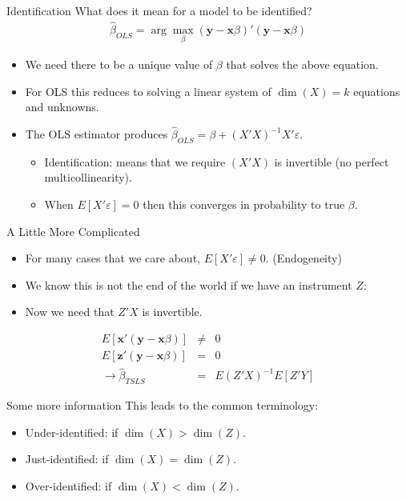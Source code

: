 \begin{frame}{Identification}
What does it mean for a model to be identified?
\begin{eqnarray*}
\hat{\beta}_{OLS} = \arg \max_{\beta} (\mathbf{y} - \mathbf{x} \beta)' (\mathbf{y} - \mathbf{x} \beta)
\end{eqnarray*}
\begin{itemize}
\item We need there to be a unique value of $\beta$ that solves the above equation.
\item For OLS this reduces to solving a linear system of $\dim(X)=k$ equations and unknowns.
\item The OLS estimator produces $\hat{\beta}_{OLS} = \beta + (X'X)^{-1}X'\varepsilon$.
\begin{itemize}
\item Identification: means that we require $(X'X)$ is invertible (no perfect multicollinearity).
\item When $E[X' \varepsilon ] =0$ then this converges in probability to true $\beta$.
\end{itemize}

\end{itemize}
\end{frame}

\begin{frame}{A Little More Complicated}
\begin{itemize}
\item For many cases that we care about, $E[X' \varepsilon ] \neq 0$. (Endogeneity)
\item We know this is not the end of the world if we have an instrument $Z$:
\item Now we need that $Z'X$ is invertible.
\end{itemize}
\begin{eqnarray*}
E[\mathbf{x}' (\mathbf{y} - \mathbf{x} \beta)] &\neq& 0\\
E[\mathbf{z}' (\mathbf{y} - \mathbf{x} \beta)] &=&0\\
\rightarrow \hat{\beta}_{TSLS} &=& E(Z'X)^{-1} E[Z'Y]
\end{eqnarray*}
\end{frame}


\begin{frame}{Some more information}
This leads to the common terminology:
\begin{itemize}
\item Under-identified: if $\dim(X) > \dim(Z)$.
\item Just-identified: if $\dim(X) = \dim(Z)$.
\item Over-identified: if $\dim(X) < \dim(Z)$.
\end{itemize}
\end{frame}

